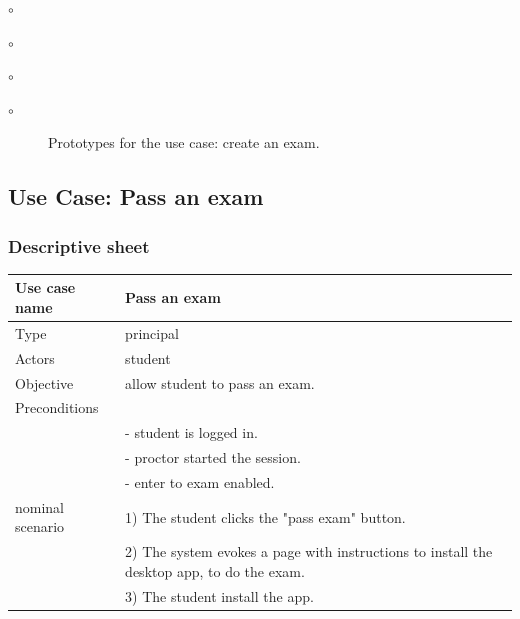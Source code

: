 \documentclass[]{uc2pfecaneva}
\begin{document}
\begin{list}{$\circ$}{}
\begin{list}{$\circ$}{}
\begin{list}{$\circ$}{}
\begin{list}{$\circ$}{}
\begin{figure}[h]
        \caption{Prototypes for the use case: create an exam.}
    \end{figure}
    \clearpage




    \begin{table}[h]
        \raggedright\subsection{Use Case: Pass an exam}
        \subsubsection{Descriptive sheet}
        \centering
        \begin{tabularx}{\textwidth}{|l|X|}
            \hline
            Use case name         & Pass an exam                                                                           \\ \hline
            Type                  & principal                                                                                         \\ \hline
            Actors                & student                                                                                           \\ \hline
            Objective             & allow student to pass an exam.                                                                    \\ \hline
            Preconditions         &                                                                                                   \\
            & - student is logged in.                                                                           \\
            & - proctor started the session.                                                                    \\
            & - enter to exam enabled.                                                                          \\ \hline
            nominal scenario
            & 1) The student clicks the "pass exam" button.                                                     \\
            & 2) The system evokes a page with instructions to install the desktop app, to do the exam.         \\
            & 3) The student install the app.                                                                   \\

\end{tabularx}
\end{table}
\end{list}
\end{list}
\end{list}
\end{list}
\end{document}

